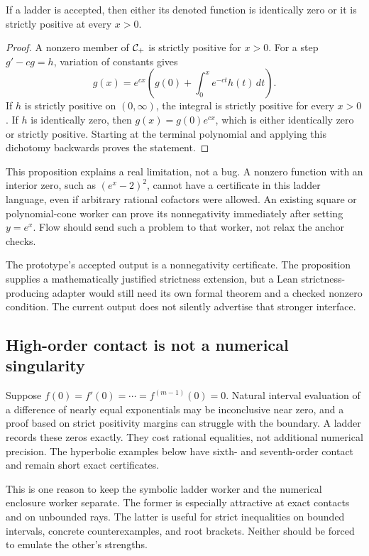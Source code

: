 \begin{proposition}
\label{prop:strict}
If a ladder is accepted, then either its denoted function is identically zero or it is strictly positive at every $x>0$.
\end{proposition}
\begin{proof}
A nonzero member of $\mathcal C_+$ is strictly positive for $x>0$. For a step $g'-cg=h$, variation of constants gives
\begin{equation}
 g(x)=e^{cx}\left(g(0)+\int_0^x e^{-ct}h(t)\,dt\right).
 \label{eq:variation}
\end{equation}
If $h$ is strictly positive on $(0,\infty)$, the integral is strictly positive for every $x>0$. If $h$ is identically zero, then $g(x)=g(0)e^{cx}$, which is either identically zero or strictly positive. Starting at the terminal polynomial and applying this dichotomy backwards proves the statement.
\end{proof}

This proposition explains a real limitation, not a bug. A nonzero function with an interior zero, such as $(e^x-2)^2$, cannot have a certificate in this ladder language, even if arbitrary rational cofactors were allowed. An existing square or polynomial-cone worker can prove its nonnegativity immediately after setting $y=e^x$. Flow should send such a problem to that worker, not relax the anchor checks.

The prototype's accepted output is a nonnegativity certificate. The proposition supplies a mathematically justified strictness extension, but a Lean strictness-producing adapter would still need its own formal theorem and a checked nonzero condition. The current output does not silently advertise that stronger interface.

\subsection{High-order contact is not a numerical singularity}

Suppose $f(0)=f'(0)=\cdots=f^{(m-1)}(0)=0$. Natural interval evaluation of a difference of nearly equal exponentials may be inconclusive near zero, and a proof based on strict positivity margins can struggle with the boundary. A ladder records these zeros exactly. They cost rational equalities, not additional numerical precision. The hyperbolic examples below have sixth- and seventh-order contact and remain short exact certificates.

This is one reason to keep the symbolic ladder worker and the numerical enclosure worker separate. The former is especially attractive at exact contacts and on unbounded rays. The latter is useful for strict inequalities on bounded intervals, concrete counterexamples, and root brackets. Neither should be forced to emulate the other's strengths.
